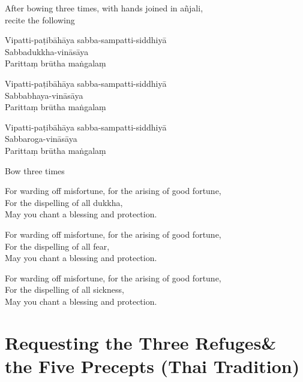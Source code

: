 \begin{instruction}
  After bowing three times, with hands joined in añjali,\\
  recite the following
\end{instruction}

Vipatti-paṭibāhāya sabba-sampatti-siddhiyā\\
Sabbadukkha-vināsāya\\
Parittaṃ brūtha maṅgalaṃ

Vipatti-paṭibāhāya sabba-sampatti-siddhiyā\\
Sabbabhaya-vināsāya\\
Parittaṃ brūtha maṅgalaṃ

Vipatti-paṭibāhāya sabba-sampatti-siddhiyā\\
Sabbaroga-vināsāya\\
Parittaṃ brūtha maṅgalaṃ

\begin{instruction}
  Bow three times
\end{instruction}

\begin{english}
For warding off misfortune, for the arising of good fortune,\\
For the dispelling of all dukkha,\\
May you chant a blessing and protection.

For warding off misfortune, for the arising of good fortune,\\
For the dispelling of all fear,\\
May you chant a blessing and protection.

For warding off misfortune, for the arising of good fortune,\\
For the dispelling of all sickness,\\
May you chant a blessing and protection.
\end{english}

\clearpage

\section[Three Refuges \& the Five Precepts]{Requesting the Three Refuges\newline \& the Five Precepts (Thai Tradition)}

\label{three-refuges}


